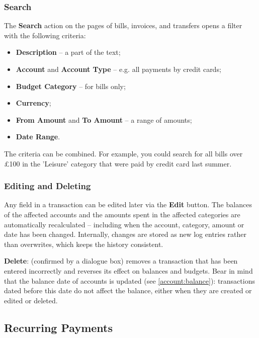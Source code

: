 

\subsubsection{Search}

The \textbf{Search} action on the pages of bills, invoices, and transfers opens a filter with
the following criteria:

\begin{itemize}
  \item \textbf{Description} -- a part of the text;
  \item \textbf{Account} and \textbf{Account Type} -- e.g. all payments by credit cards;
  \item \textbf{Budget Category} -- for bills only;
  \item \textbf{Currency};
  \item \textbf{From Amount} and \textbf{To Amount} -- a range of amounts;
  \item \textbf{Date Range}.
\end{itemize}

\noindent The criteria can be combined. For example, you could search for all bills over £100
in the 'Leisure' category that were paid by credit card last summer.


\subsubsection{Editing and Deleting}

Any field in a transaction can be edited later via the \textbf{Edit} button. The balances of
the affected accounts and the amounts spent in the affected categories are automatically
recalculated -- including when the account, category, amount or date has been changed.
Internally, changes are stored as new log entries rather than overwrites, which keeps the
history consistent.

\textbf{Delete}: (confirmed by a dialogue box) removes a transaction that has been entered
incorrectly and reverses its effect on balances and budgets. Bear in mind that the balance
date of accounts is updated (see \cref{account:balance}): transactions dated before this date
do not affect the balance, either when they are created or edited or deleted.


\subsection{Recurring Payments}

